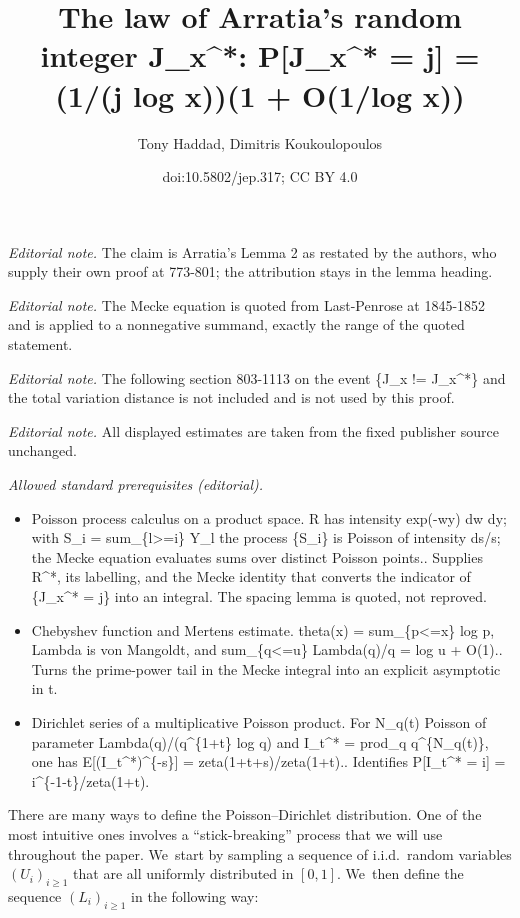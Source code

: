 \documentclass[10pt,a4paper]{article}
\title{The law of Arratia's random integer J\_x\textasciicircum{}*: P[J\_x\textasciicircum{}* = j] = (1/(j log x))(1 + O(1/log x))}
\author{Tony Haddad, Dimitris Koukoulopoulos}
\date{doi:10.5802/jep.317; CC BY 4.0}
\theoremstyle{plain}
\theoremstyle{definition}
\begin{document}
\maketitle
\noindent\textit{Editorial note.} The claim is Arratia's Lemma 2 as restated by the authors, who supply their own proof at 773-801; the attribution stays in the lemma heading.\par\medskip
\noindent\textit{Editorial note.} The Mecke equation is quoted from Last-Penrose at 1845-1852 and is applied to a nonnegative summand, exactly the range of the quoted statement.\par\medskip
\noindent\textit{Editorial note.} The following section 803-1113 on the event \{J\_x != J\_x\textasciicircum{}*\} and the total variation distance is not included and is not used by this proof.\par\medskip
\noindent\textit{Editorial note.} All displayed estimates are taken from the fixed publisher source unchanged.\par\medskip
\noindent\textit{Allowed standard prerequisites (editorial).}\begin{itemize}
\item Poisson process calculus on a product space. R has intensity exp(-wy) dw dy; with S\_i = sum\_\{l>=i\} Y\_l the process \{S\_i\} is Poisson of intensity ds/s; the Mecke equation evaluates sums over distinct Poisson points.. Supplies R\textasciicircum{}*, its labelling, and the Mecke identity that converts the indicator of \{J\_x\textasciicircum{}* = j\} into an integral. The spacing lemma is quoted, not reproved.
\item Chebyshev function and Mertens estimate. theta(x) = sum\_\{p<=x\} log p, Lambda is von Mangoldt, and sum\_\{q<=u\} Lambda(q)/q = log u + O(1).. Turns the prime-power tail in the Mecke integral into an explicit asymptotic in t.
\item Dirichlet series of a multiplicative Poisson product. For N\_q(t) Poisson of parameter Lambda(q)/(q\textasciicircum{}\{1+t\} log q) and I\_t\textasciicircum{}* = prod\_q q\textasciicircum{}\{N\_q(t)\}, one has E[(I\_t\textasciicircum{}*)\textasciicircum{}\{-s\}] = zeta(1+t+s)/zeta(1+t).. Identifies P[I\_t\textasciicircum{}* = i] = i\textasciicircum{}\{-1-t\}/zeta(1+t).
\end{itemize}\medskip
There are many ways to define the Poisson--Dirichlet distribution. One of the most intuitive ones involves a ``stick-breaking'' process that we will use throughout the paper. We~start by sampling a sequence of i.i.d.~random variables $(U_i)_{i \ge 1}$ that are all uniformly distributed in $[0, 1]$. We~then define the sequence $(L_i)_{i \ge 1}$ in the following way:
\end{document}
